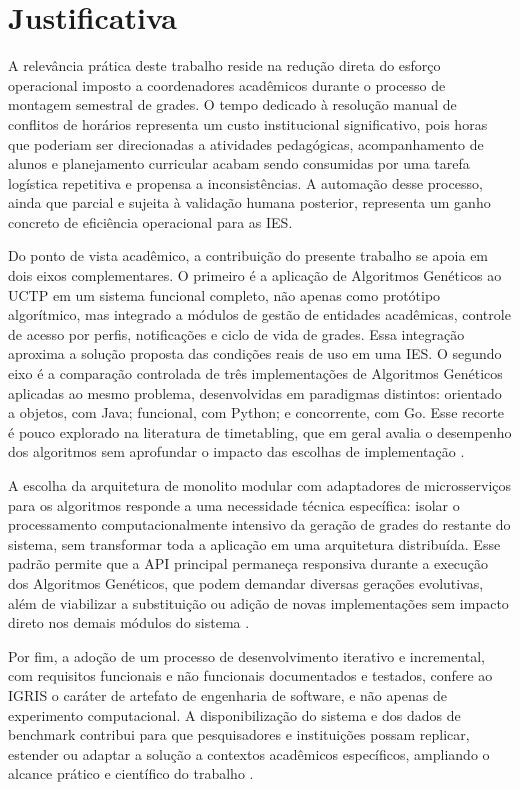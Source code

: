 \section{Justificativa}
\label{sec:1.3}

A relevância prática deste trabalho reside na redução direta do esforço operacional imposto a coordenadores acadêmicos durante o processo de montagem semestral de grades. O tempo dedicado à resolução manual de conflitos de horários representa um custo institucional significativo, pois horas que poderiam ser direcionadas a atividades pedagógicas, acompanhamento de alunos e planejamento curricular acabam sendo consumidas por uma tarefa logística repetitiva e propensa a inconsistências. A automação desse processo, ainda que parcial e sujeita à validação humana posterior, representa um ganho concreto de eficiência operacional para as IES.

Do ponto de vista acadêmico, a contribuição do presente trabalho se apoia em dois eixos complementares. O primeiro é a aplicação de Algoritmos Genéticos ao UCTP em um sistema funcional completo, não apenas como protótipo algorítmico, mas integrado a módulos de gestão de entidades acadêmicas, controle de acesso por perfis, notificações e ciclo de vida de grades. Essa integração aproxima a solução proposta das condições reais de uso em uma IES. O segundo eixo é a comparação controlada de três implementações de Algoritmos Genéticos aplicadas ao mesmo problema, desenvolvidas em paradigmas distintos: orientado a objetos, com Java; funcional, com Python; e concorrente, com Go. Esse recorte é pouco explorado na literatura de timetabling, que em geral avalia o desempenho dos algoritmos sem aprofundar o impacto das escolhas de implementação \cite{premananda2024, bashab2023}.

A escolha da arquitetura de monolito modular com adaptadores de microsserviços para os algoritmos responde a uma necessidade técnica específica: isolar o processamento computacionalmente intensivo da geração de grades do restante do sistema, sem transformar toda a aplicação em uma arquitetura distribuída. Esse padrão permite que a API principal permaneça responsiva durante a execução dos Algoritmos Genéticos, que podem demandar diversas gerações evolutivas, além de viabilizar a substituição ou adição de novas implementações sem impacto direto nos demais módulos do sistema \cite{newman2021}.

Por fim, a adoção de um processo de desenvolvimento iterativo e incremental, com requisitos funcionais e não funcionais documentados e testados, confere ao IGRIS o caráter de artefato de engenharia de software, e não apenas de experimento computacional. A disponibilização do sistema e dos dados de benchmark contribui para que pesquisadores e instituições possam replicar, estender ou adaptar a solução a contextos acadêmicos específicos, ampliando o alcance prático e científico do trabalho \cite{sommerville2016}.
